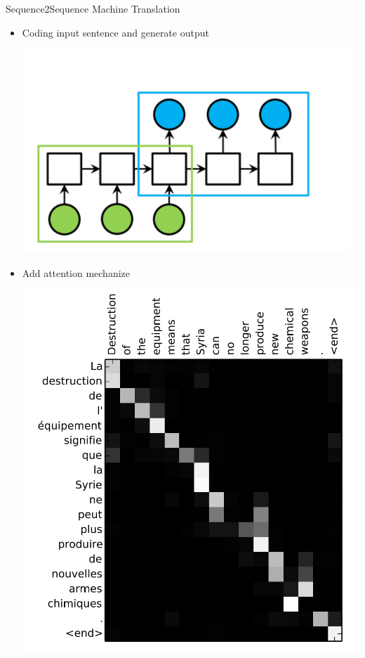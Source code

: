 \documentclass{beamer}
\begin{document}
\begin{frame}{Sequence2Sequence Machine Translation }
		\begin{itemize}
			\item   Coding input sentence and generate output
				 \begin{center}
					\includegraphics[scale=0.2]{./img/transl.png}
				\end{center}
			\item   Add attention mechanize
				 \begin{center}
					\includegraphics[scale=0.32]{./img/tr.png}
				\end{center}
		\end{itemize}


\end{frame}
\end{document}
